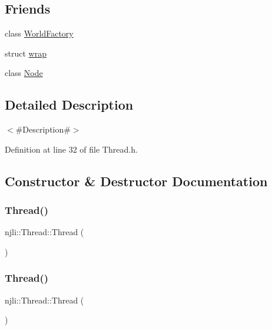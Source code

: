 \subsection*{Friends}
\begin{DoxyCompactItemize}
\item 
class \mbox{\hyperlink{classnjli_1_1_thread_acb96ebb09abe8f2a37a915a842babfac}{World\+Factory}}
\item 
struct \mbox{\hyperlink{classnjli_1_1_thread_a4e3bf95b63db6ec0ddadd05ed67dde6c}{wrap}}
\item 
class \mbox{\hyperlink{classnjli_1_1_thread_a6db9d28bd448a131448276ee03de1e6d}{Node}}
\end{DoxyCompactItemize}


\subsection{Detailed Description}
$<$\#\+Description\#$>$ 

Definition at line 32 of file Thread.\+h.



\subsection{Constructor \& Destructor Documentation}
\mbox{\label{classnjli_1_1_thread_a317e23ba8f0ced14960249e4c54c6090}} 
\subsubsection{\texorpdfstring{Thread()}{Thread()}\hspace{0.1cm}{\footnotesize\ttfamily [1/3]}}
{\footnotesize\ttfamily njli\+::\+Thread\+::\+Thread (\begin{DoxyParamCaption}{ }\end{DoxyParamCaption})\hspace{0.3cm}{\ttfamily [protected]}}

\mbox{\label{classnjli_1_1_thread_a0c051d119b52f3daec20229275c5f889}} 
\subsubsection{\texorpdfstring{Thread()}{Thread()}\hspace{0.1cm}{\footnotesize\ttfamily [2/3]}}
{\footnotesize\ttfamily njli\+::\+Thread\+::\+Thread (\begin{DoxyParamCaption}\item[{const \mbox{\hyperlink{classnjli_1_1_abstract_builder}{Abstract\+Builder}} \&}]{ }\end{DoxyParamCaption})\hspace{0.3cm}{\ttfamily [protected]}}


